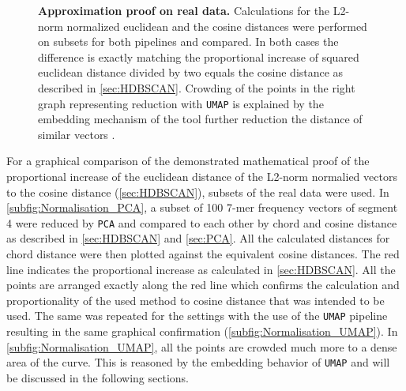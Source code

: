 \begin{figure}[!hbt]
\begin{subfigure}[b]{0.475\textwidth}
    \end{subfigure}
    \caption[Approximation proof on real data]{\textbf{Approximation proof on real data.} Calculations for the L2-norm normalized euclidean and the cosine distances were performed on subsets for both pipelines and compared. In both cases the difference is exactly matching the proportional increase of squared euclidean distance divided by two equals the cosine distance as described in \autoref{sec:HDBSCAN}. Crowding of the points in the right graph representing reduction with \texttt{UMAP} is explained by the embedding mechanism of the tool further reduction the distance of similar vectors \autocite{mcinnes_umap_2020}.}
    \label{fig:Normalisation_Methods}
\end{figure}

\vspace{1em}

For a graphical comparison of the demonstrated mathematical proof of the proportional increase of the euclidean distance of the L2-norm normalied vectors to the cosine distance (\autoref{sec:HDBSCAN}), subsets of the real data were used. In \autoref{subfig:Normalisation_PCA}, a subset of 100 7-mer frequency vectors of segment 4 were reduced by \texttt{PCA} and compared to each other by chord and cosine distance as described in \autoref{sec:HDBSCAN} and \autoref{sec:PCA}. All the calculated distances for chord distance were then plotted against the equivalent cosine distances. The red line indicates the proportional increase as calculated in \autoref{sec:HDBSCAN}. All the points are arranged exactly along the red line which confirms the calculation and proportionality of the used method to cosine distance that was intended to be used. The same was repeated for the settings with the use of the \texttt{UMAP} pipeline resulting in the same graphical confirmation (\autoref{subfig:Normalisation_UMAP}). In \autoref{subfig:Normalisation_UMAP}, all the points are crowded much more to a dense area of the curve. This is reasoned by the embedding behavior of \texttt{UMAP} and will be discussed in the following sections.











